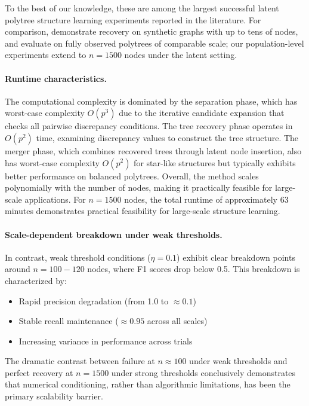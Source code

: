\documentclass[11pt,a4paper]{article}
\numberwithin{equation}{section}
\begin{document}
To the best of our knowledge, these are among the largest successful
latent polytree structure learning experiments reported in the literature.
For comparison, \citet{etesami:kiyavash:coleman:2016} demonstrate recovery
on synthetic graphs with up to tens of nodes, and \citet{tramontano:monod:drton:2022}
evaluate on fully observed polytrees of comparable scale; our population-level
experiments extend to $n=1500$ nodes under the latent setting.

\paragraph{Runtime characteristics.} The computational complexity is dominated by the separation phase, which has worst-case complexity $O(p^3)$ due to the iterative candidate expansion that checks all pairwise discrepancy conditions. The tree recovery phase operates in $O(p^2)$ time, examining discrepancy values to construct the tree structure. The merger phase, which combines recovered trees through latent node insertion, also has worst-case complexity $O(p^2)$ for star-like structures but typically exhibits better performance on balanced polytrees. Overall, the method scales polynomially with the number of nodes, making it practically feasible for large-scale applications. For $n = 1500$ nodes, the total runtime of approximately 63 minutes demonstrates practical feasibility for large-scale structure learning.

\paragraph{Scale-dependent breakdown under weak thresholds.} In contrast, weak threshold conditions ($\eta = 0.1$) exhibit clear breakdown points around $n = 100-120$ nodes, where F1 scores drop below 0.5. This breakdown is characterized by:
\begin{itemize}
\item Rapid precision degradation (from 1.0 to $\approx 0.1$)
\item Stable recall maintenance ($\approx 0.95$ across all scales)
\item Increasing variance in performance across trials
\end{itemize}

The dramatic contrast between failure at $n \approx 100$ under weak thresholds and perfect recovery at $n = 1500$ under strong thresholds conclusively demonstrates that numerical conditioning, rather than algorithmic limitations, has been the primary scalability barrier.
\end{document}
